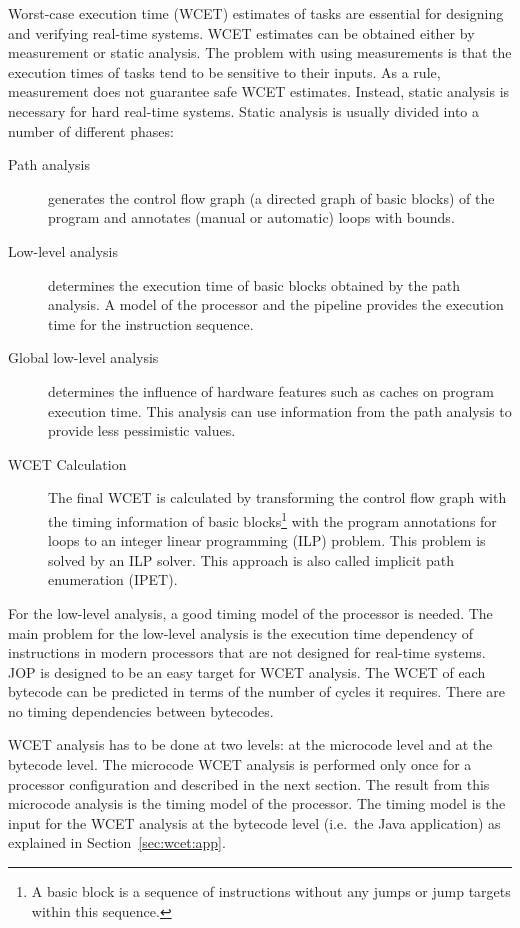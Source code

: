 Worst-case execution time (WCET) estimates of tasks are essential
for designing and verifying real-time systems. WCET estimates can be
obtained either by measurement or static analysis. The problem with
using measurements is that the execution times of tasks tend to be
sensitive to their inputs. As a rule, measurement does not guarantee
safe WCET estimates. Instead, static analysis is necessary for hard
real-time systems. Static analysis is usually divided into a number
of different phases:
\begin{description}
    \item[Path analysis] generates the control flow graph (a directed
    graph of basic blocks) of the program and annotates (manual or
    automatic) loops with bounds.
    \item[Low-level analysis] determines the execution time of basic
    blocks obtained by the path analysis. A model of the processor
    and the pipeline provides the execution time for the instruction
    sequence.
    \item[Global low-level analysis] determines the influence of
    hardware features such as caches on program execution time. This
    analysis can use information from the path analysis to provide less
    pessimistic values.
    \item[WCET Calculation] The final WCET is calculated by
        transforming the control flow graph with the timing
        information of basic blocks\footnote{A basic block is a
        sequence of instructions without any jumps or jump
        targets within this sequence.} with the program
        annotations for loops to an integer linear programming
        (ILP) problem. This problem is solved by an ILP solver.
        This approach is also called implicit path enumeration
        (IPET).
\end{description}

For the low-level analysis, a good timing model of the processor is
needed. The main problem for the low-level analysis is the execution
time dependency of instructions in modern processors that are not
designed for real-time systems. JOP is designed to be an easy target
for WCET analysis. The WCET of each bytecode can be predicted in
terms of the number of cycles it requires. There are no timing
dependencies between bytecodes.

WCET analysis has to be done at two levels: at the microcode level
and at the bytecode level. The microcode WCET analysis is performed
only once for a processor configuration and described in the next
section. The result from this microcode analysis is the timing model
of the  processor. The timing model is the input for the WCET
analysis at the bytecode level (i.e.\ the Java application) as
explained in Section~\ref{sec:wcet:app}.

